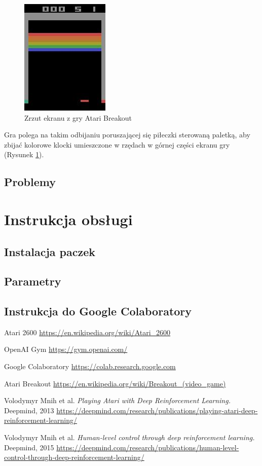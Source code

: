 \documentclass[12pt]{article}
\begin{document}
\begin{figure}[H]
\centering \includegraphics[scale=1]{1_raw.jpg}
\caption{Zrzut ekranu z gry Atari Breakout}
\label{atari1}
\end{figure}

Gra polega na takim odbijaniu poruszającej się piłeczki sterowaną paletką, aby zbijać kolorowe klocki umieszczone w rzędach w górnej części ekranu gry (Rysunek \ref{atari1}). 

\subsection{Problemy}

\section{Instrukcja obsługi}
\subsection{Instalacja paczek}
\subsection{Parametry}
\subsection{Instrukcja do Google Colaboratory \cite{colab}}

\begin{thebibliography}{9}

  Atari 2600 \url{https://en.wikipedia.org/wiki/Atari_2600}

  OpenAI Gym \url{https://gym.openai.com/}

  Google Colaboratory \url{https://colab.research.google.com}

  Atari Breakout \url{https://en.wikipedia.org/wiki/Breakout_(video_game)}

  Volodymyr Mnih et al. 
\textit{Playing Atari with Deep Reinforcement Learning.} Deepmind, 2013
   \url{https://deepmind.com/research/publications/playing-atari-deep-reinforcement-learning/}

  Volodymyr Mnih et al. 
\textit{Human-level control through deep reinforcement learning.} Deepmind, 2015
   \url{https://deepmind.com/research/publications/human-level-control-through-deep-reinforcement-learning/}


\end{thebibliography}
\end{document}
